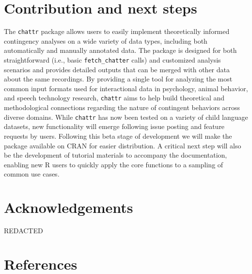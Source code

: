 \documentclass[10pt, letterpaper]{article}
\begin{document}
\hypertarget{contribution-and-next-steps}{%
\section{Contribution and next
steps}\label{contribution-and-next-steps}}

The \texttt{chattr} package allows users to easily implement
theoretically informed contingency analyses on a wide variety of data
types, including both automatically and manually annotated data. The
package is designed for both straightforward (i.e., basic
\texttt{fetch\_chatter} calls) and customized analysis scenarios and
provides detailed outputs that can be merged with other data about the
same recordings. By providing a single tool for analyzing the most
common input formats used for interactional data in psychology, animal
behavior, and speech technology research, \texttt{chattr} aims to help
build theoretical and methodological connections regarding the nature of
contingent behaviors across diverse domains. While \texttt{chattr} has
now been tested on a variety of child language datasets, new
functionality will emerge following issue posting and feature requests
by users. Following this beta stage of development we will make the
package available on CRAN for easier distribution. A critical next step
will also be the development of tutorial materials to accompany the
documentation, enabling new R users to quickly apply the core functions
to a sampling of common use cases.

\hypertarget{acknowledgements}{%
\section{Acknowledgements}\label{acknowledgements}}

REDACTED

\hypertarget{references}{%
\section{References}\label{references}}

\setlength{\parindent}{-0.1in} 
\setlength{\leftskip}{0.125in}

\noindent


\end{document}
